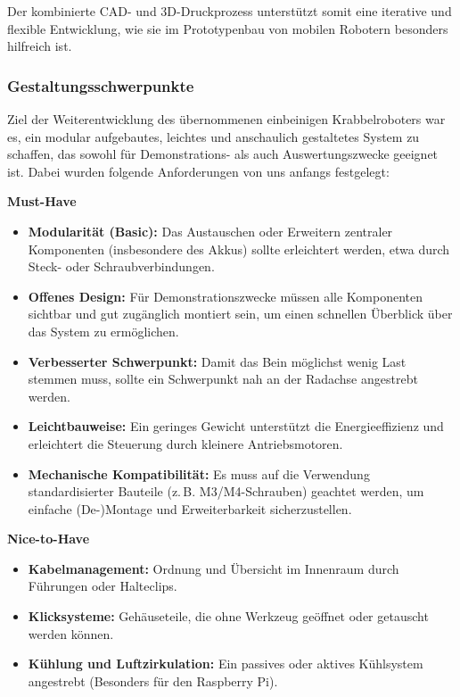 Der kombinierte CAD- und 3D-Druckprozess unterstützt somit eine iterative und flexible Entwicklung, wie sie im Prototypenbau von mobilen Robotern besonders hilfreich ist.

\subsubsection{Gestaltungsschwerpunkte}

Ziel der Weiterentwicklung des übernommenen einbeinigen Krabbelroboters war es, ein modular aufgebautes, leichtes und anschaulich gestaltetes System zu schaffen, das sowohl für Demonstrations- als auch Auswertungszwecke geeignet ist. Dabei wurden folgende Anforderungen von uns anfangs festgelegt:

\textbf{Must-Have}
\begin{itemize}
  \item \textbf{Modularität (Basic):} Das Austauschen oder Erweitern zentraler Komponenten (insbesondere des Akkus) sollte erleichtert werden, etwa durch Steck- oder Schraubverbindungen.
  \item \textbf{Offenes Design:} Für Demonstrationszwecke müssen alle Komponenten sichtbar und gut zugänglich montiert sein, um einen schnellen Überblick über das System zu ermöglichen.
  \item \textbf{Verbesserter Schwerpunkt:} Damit das Bein möglichst wenig Last stemmen muss, sollte ein Schwerpunkt nah an der Radachse angestrebt werden.
  \item \textbf{Leichtbauweise:} Ein geringes Gewicht unterstützt die Energieeffizienz und erleichtert die Steuerung durch kleinere Antriebsmotoren.
  \item \textbf{Mechanische Kompatibilität:} Es muss auf die Verwendung standardisierter Bauteile (z.\,B. M3/M4-Schrauben) geachtet werden, um einfache (De-)Montage und Erweiterbarkeit sicherzustellen.
\end{itemize}

\textbf{Nice-to-Have}
\begin{itemize}
  \item \textbf{Kabelmanagement:} Ordnung und Übersicht im Innenraum durch Führungen oder Halteclips.
  \item \textbf{Klicksysteme:} Gehäuseteile, die ohne Werkzeug geöffnet oder getauscht werden können.
  \item \textbf{Kühlung und Luftzirkulation:} Ein passives oder aktives Kühlsystem angestrebt (Besonders für den Raspberry Pi).
\end{itemize}

